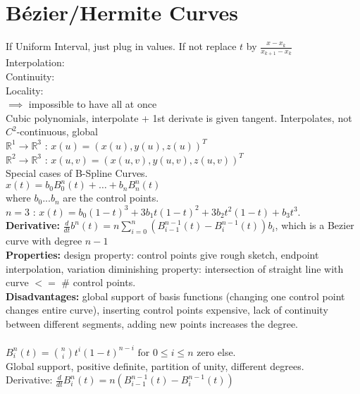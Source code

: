 \section{Bézier/Hermite Curves}
\BoxStart
{} If Uniform Interval, just plug in values. If not replace $t$ by $\frac{x - x_k}{x_{k + 1} - x_k}$
\BoxEnd
{} \\
Interpolation: \\
Continuity: \\
Locality:  \\
$\implies$ impossible to have all at once\\
Cubic polynomials, interpolate + 1st derivate is given tangent. Interpolates, not $C^2$-continuous, global\\
 $\mathbb{R}^1 \to \mathbb{R}^3$ : $x(u) = (x(u), y(u), z(u))^T$\\
$\mathbb{R}^2 \to \mathbb{R}^3$ : $x(u,v) = (x(u,v), y(u,v), z(u,v))^T$\\
Special cases of B-Spline Curves. \\
${x}(t) = b_0 B_0^n(t) + \dots + b_n B_n^n(t)$ \\
where $b_0 ...b_n$ are the control points. 
\\
$n = 3 $ : ${x}(t) = b_0(1-t)^3 + 3b_1t(1-t)^2 + 3b_2t^2(1-t) + b_3t^3$. 
\\
\textbf{Derivative:} $\frac{d}{dt} b^n(t) = n \sum_{i=0}^{n} \left( B_{i-1}^{n-1}(t) - B_i^{n-1}(t) \right) b_i$, which is a Bezier curve with degree $n - 1$\\
\textbf{Properties:} design property: control points give rough sketch, endpoint interpolation, variation diminishing property: intersection of straight line with curve $<=$ \# control points.\\
\textbf{Disadvantages:} global support of basis functions (changing one control point changes entire curve), inserting control points expensive, lack of continuity between different segments, adding new points increases the degree.\\
\\
$B_i^n(t) = \binom{n}{i} t^i (1 - t)^{n-i} \text{ for } 0 \leq i \leq n$ zero else. 
\\
Global support, positive definite, partition of unity, different degrees. 
\\
Derivative: $\frac{d}{dt} B_i^n(t) = n \left( B_{i-1}^{n-1}(t) - B_i^{n-1}(t) \right)$


